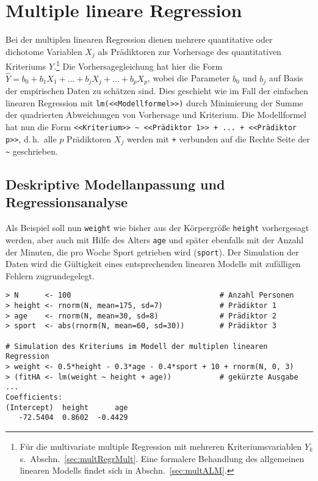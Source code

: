 \section{Multiple lineare Regression}
\label{sec:regrMult}

Bei der multiplen linearen Regression dienen mehrere quantitative oder dichotome Variablen $X_{j}$ als Prädiktoren zur Vorhersage des quantitativen Kriteriums $Y$.\footnote{Für die multivariate multiple Regression mit mehreren Kriteriumsvariablen $Y_{k}$ s.\ Abschn.\ \ref{sec:multRegrMult}. Eine formalere Behandlung des allgemeinen linearen Modells findet sich in Abschn.\ \ref{sec:multALM}.} Die Vorhersagegleichung hat hier die Form $\hat{Y} = b_{0} + b_{1} X_{1} + {\dots} + b_{j} X_{j} + {\dots} + b_{p} X_{p}$, wobei die Parameter $b_{0}$ und $b_{j}$ auf Basis der empirischen Daten zu schätzen sind. Dies geschieht wie im Fall der einfachen linearen Regression mit \lstinline!lm(<<Modellformel>>)! durch Minimierung der Summe der quadrierten Abweichungen von Vorhersage und Kriterium. Die Modellformel hat nun die Form \lstinline!<<Kriterium>> ~ <<Prädiktor 1>> + ... + <<Prädiktor p>>!, d.\,h.\ alle $p$ Prädiktoren $X_{j}$ werden mit \lstinline!+! verbunden auf die Rechte Seite der \lstinline!~! geschrieben.

\subsection{Deskriptive Modellanpassung und Regressionsanalyse}
\label{sec:regrMultAn}

Als Beispiel soll nun \lstinline!weight! wie bisher aus der Körpergröße \lstinline!height! vorhergesagt werden, aber auch mit Hilfe des Alters \lstinline!age! und später ebenfalls mit der Anzahl der Minuten, die pro Woche Sport getrieben wird (\lstinline!sport!). Der Simulation der Daten wird die Gültigkeit eines entsprechenden linearen Modells mit zufälligen Fehlern zugrundegelegt.
\begin{lstlisting}
> N      <- 100                                  # Anzahl Personen
> height <- rnorm(N, mean=175, sd=7)             # Prädiktor 1
> age    <- rnorm(N, mean=30, sd=8)              # Prädiktor 2
> sport  <- abs(rnorm(N, mean=60, sd=30))        # Prädiktor 3

# Simulation des Kriteriums im Modell der multiplen linearen Regression
> weight <- 0.5*height - 0.3*age - 0.4*sport + 10 + rnorm(N, 0, 3)
> (fitHA <- lm(weight ~ height + age))           # gekürzte Ausgabe ...
Coefficients:
(Intercept)  height      age
   -72.5404  0.8602  -0.4429
\end{lstlisting}

